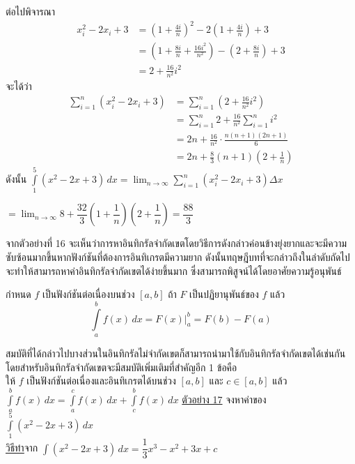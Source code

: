 \documentclass[hidelinks,12pt,a4paper]{article}
\newcommand{\s}{\space}
\newcommand{\qed}{\scalebox{0.8}{$\blacksquare$}}
\begin{document}
\hspace{15mm} ต่อไปพิจารณา
\begin{align*}
    x_i^2-2x_i+3 & = \left(1+\frac{4i}{n}\right)^2-2\left(1+\frac{4i}{n}\right)+3 \\
    & = \left(1+\frac{8i}{n}+\frac{16i^2}{n^2}\right)-\left(2+\frac{8i}{n}\right)+3 \\
    & = 2+\frac{16}{n^2}i^2
\end{align*}
\hspace{15mm} จะได้ว่า
\begin{align*}
    \sum_{i=1}^n (x_i^2-2x_i+3) & = \sum_{i=1}^n \left(2+\frac{16}{n^2}i^2\right) \\
    & = \sum_{i=1}^n 2 + \frac{16}{n^2}\sum_{i=1}^n i^2 \\
    & = 2n+\frac{16}{n^2}\cdot \frac{n(n+1)(2n+1)}{6} \\
    & = 2n+\frac{8}{3}(n+1)\left(2+\frac{1}{n}\right)
\end{align*}
\hspace{15mm} ดังนั้น 
$\displaystyle\int\limits_1^5 (x^2-2x+3)\,dx = \displaystyle\lim_{n\to\infty} \sum_{i=1}^n (x_i^2-2x_i+3)\Delta x $

\hspace{60mm}$= \displaystyle\lim_{n\to\infty} 8+\dfrac{32}{3}\left(1+\dfrac{1}{n}\right)\left(2+\dfrac{1}{n}\right) = \dfrac{88}{3}$ \hfill \qed

\vspace{3mm}
จากตัวอย่างที่ 16 จะเห็นว่าการหาอินทิกรัลจำกัดเขตโดยวิธีการดังกล่าวค่อนข้างยุ่งยากและจะมีความซับซ้อนมากขึ้นหากฟังก์ชันที่ต้องการอินทิเกรตมีความยาก ดังนั้นทฤษฎีบทที่จะกล่าวถึงในลำดับถัดไปจะทำให้สามารถหาค่าอินทิกรัลจำกัดเขตได้ง่ายขึ้นมาก ซึ่งสามารถพิสูจน์ได้โดยอาศัยความรู้อนุพันธ์
\begin{tcolorbox}[title=\textbf{ทฤษฎีบทหลักมูลของแคลคูลัส (Fundamental Theorem of Calculus)}]
    กำหนด $f$ เป็นฟังก์ชันต่อเนื่องบนช่วง $[a,b]$ \s ถ้า $F$ เป็นปฏิยานุพันธ์ของ $f$ แล้ว
    \begin{equation*}
        \int\limits_a^b f(x)\,dx = F(x)\Bigr|_a^b = F(b)-F(a)
    \end{equation*}
\end{tcolorbox}

สมบัติที่ได้กล่าวไปบางส่วนในอินทิกรัลไม่จำกัดเขตก็สามารถนำมาใช้กับอินทิกรัลจำกัดเขตได้เช่นกัน โดยสำหรับอินทิกรัลจำกัดเขตจะมีสมบัติเพิ่มเติมที่สำคัญอีก 1 ข้อคือ \\
ให้ $f$ เป็นฟังก์ชันต่อเนื่องและอินทิเกรตได้บนช่วง $[a,b]$ และ $c\in[a,b]$ แล้ว \s $\displaystyle\int\limits_a^b f(x)\,dx = \displaystyle\int\limits_a^c f(x)\,dx + \displaystyle\int\limits_c^b f(x)\,dx$
\newpage
\underline{ตัวอย่าง 17} จงหาค่าของ \s $\displaystyle\int\limits_1^5 (x^2-2x+3)\,dx$ \\[1ex]
\underline{\underline{วิธีทำ}}\hspace{8mm}จาก \s $\displaystyle\int (x^2-2x+3)\,dx = \dfrac{1}{3}x^3-x^2+3x+c$
\end{document}
